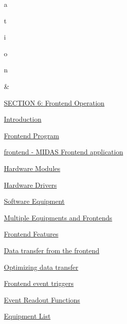 \begin{TabularC}{2}
\begin{TabularC}{2}
a\par
t\par
i\par
o\par
n\par
   &\label{O_Contents_Page_FrontendOperation_section_index}
\hypertarget{O_Contents_Page_FrontendOperation_section_index}{}
 \par
 \hyperlink{FrontendOperation}{SECTION 6: Frontend Operation} 
\begin{DoxyItemize}
\item \hyperlink{FrontendOperation_FE_Intro}{Introduction} 
\begin{DoxyItemize}
\item \hyperlink{FrontendOperation_FE_program}{Frontend Program} 
\item \hyperlink{FrontendOperation_FE_frontend_utility}{frontend -\/ MIDAS Frontend application} 
\item \hyperlink{FrontendOperation_FE_hw_equipment}{Hardware Modules} 
\item \hyperlink{FrontendOperation_FE_drivers}{Hardware Drivers} 
\item \hyperlink{FrontendOperation_FE_sw_equipment}{Software Equipment} 
\item \hyperlink{FrontendOperation_FE_multi}{Multiple Equipments and Frontends} 
\item \hyperlink{FrontendOperation_FE_features}{Frontend Features} 
\item \hyperlink{FrontendOperation_FE_data_transfer}{Data transfer from the frontend} 
\begin{DoxyItemize}
\item \hyperlink{FrontendOperation_FE_optimize_transfer}{Optimizing data transfer} 
\end{DoxyItemize}
\item \hyperlink{FrontendOperation_FE_event_trigger}{Frontend event triggers} 
\item \hyperlink{FrontendOperation_FE_equipment_readout_function}{Event Readout Functions} 
\end{DoxyItemize}
\item \hyperlink{FrontendOperation_FE_Equipment_list}{Equipment List} \par
 

\end{DoxyItemize}
\end{TabularC}
\end{TabularC}
